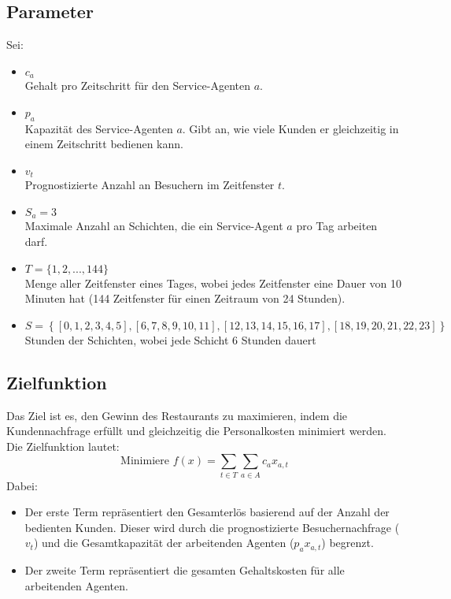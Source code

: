 \subsection*{Parameter}
Sei:
\begin{itemize}
    \item $ c_a $\\
          Gehalt pro Zeitschritt für den Service-Agenten $ a $.
    \item $ p_a $\\
          Kapazität des Service-Agenten $ a $. Gibt an, wie viele Kunden er gleichzeitig in einem Zeitschritt bedienen kann.
    \item $ v_t $\\
          Prognostizierte Anzahl an Besuchern im Zeitfenster $ t $.
    \item $ S_a = 3 $\\
          Maximale Anzahl an Schichten, die ein Service-Agent $ a $ pro Tag arbeiten darf.
    \item $ T = \{1, 2, ..., 144\}$\\
          Menge aller Zeitfenster eines Tages, wobei jedes Zeitfenster eine Dauer von 10 Minuten hat (144 Zeitfenster für einen Zeitraum von 24 Stunden).
    \item $ S = \left\{ \left[0, 1, 2, 3, 4, 5 \right], \left[ 6, 7, 8, 9, 10, 11 \right] , \left[ 12, 13, 14, 15, 16, 17 \right] , \left[ 18, 19, 20, 21, 22, 23 \right] \right\} $\\
          Stunden der Schichten, wobei jede Schicht 6 Stunden dauert
\end{itemize}

\subsection*{Zielfunktion}
Das Ziel ist es, den Gewinn des Restaurants zu maximieren, indem die Kundennachfrage erfüllt und gleichzeitig die Personalkosten minimiert werden. Die Zielfunktion lautet:
$$\text{Minimiere } f(x) = \sum_{t \in T} \sum_{a \in A} c_a x_{a,t}$$
Dabei:
\begin{itemize}
    \item Der erste Term repräsentiert den Gesamterlös basierend auf der Anzahl der bedienten Kunden. Dieser wird durch die prognostizierte Besuchernachfrage ($v_t$) und die Gesamtkapazität der arbeitenden Agenten ($p_a x_{a,t}$) begrenzt.
    \item Der zweite Term repräsentiert die gesamten Gehaltskosten für alle arbeitenden Agenten.
\end{itemize}

